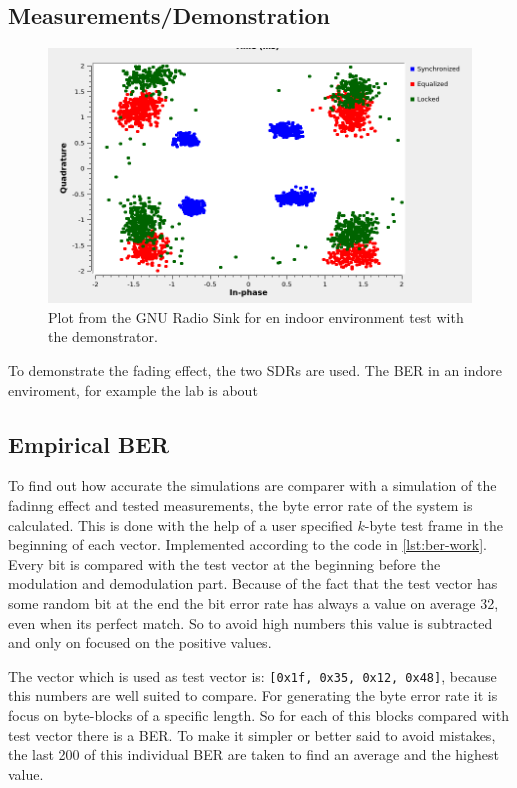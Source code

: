 \subsection{Measurements/Demonstration}

\begin{figure}
	\centering
	\includegraphics[frame, width = \linewidth]{figures/screenshots/Hardware_indoor.png}
	\caption{
		Plot from the GNU Radio Sink for en indoor environment test with the demonstrator.
		\label{fig:GR-Hardware-indoor}
	}
\end{figure}
To demonstrate the fading effect, the two SDRs are used.
The BER in an indore enviroment, for example the lab is about 


\subsection{Empirical BER} \label{sec:ber}
To find out how accurate the simulations are comparer with a simulation of the fadinng effect and tested measurements, the byte error rate of the system is calculated. This is done with the help of a user specified \(k\)-byte test frame in the beginning of each vector. Implemented according to the code in \ref{lst:ber-work}. Every bit is compared with the test vector at the beginning before the modulation and demodulation part. 
Because of the fact that the test vector has some random bit at the end the bit error rate has always a value on average 32, even when its perfect match.  So to avoid high numbers this value is subtracted and only on focused on the positive values. 

The vector which is used as test vector is: \texttt{[0x1f, 0x35, 0x12, 0x48]}, because this numbers are well suited to compare.
For generating the byte error rate it is focus on byte-blocks of a specific length. So for each of this blocks compared with test vector there is a BER. To make it simpler or better said to avoid mistakes, the last 200 of this individual BER are taken to find an average and the highest value. 

